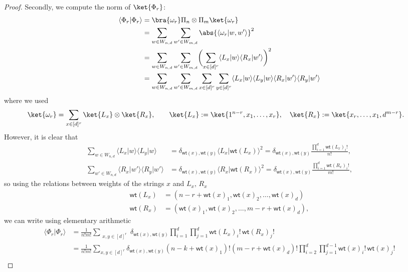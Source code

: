 \documentclass[aps,twocolumn,pra,superscriptaddress,nofootinbib]{revtex4-2}
\DeclarePairedDelimiter{\of}{\lparen}{\rparen}
\newcommand{\brakett}[2]{\langle #1 \vert #2 \rangle}
\begin{document}
\begin{proof}
    Secondly, we compute the norm of $\ket{\Phi_r}$:
    \begin{align}
        \brakett{\Phi_r}{\Phi_r} &= \bra{\omega_r} \Pi_{n} \otimes \Pi_{m} \ket{\omega_r} \\
        &= \sum_{w \in W_{n,d}} \sum_{w' \in W_{m,d}} \abs{\brakett{\omega_r}{w, w'}}^2 \\
        &= \sum_{w \in W_{n,d}} \sum_{w' \in W_{m,d}} \of[\bigg]{\sum_{x \in [d]^r} \brakett{L_x}{w} \brakett{R_x}{w'}}^2\\
        &= \sum_{w \in W_{n,d}} \sum_{w' \in W_{m,d}} \sum_{x \in [d]^r} \sum_{y \in [d]^r} \brakett{L_x}{w} \brakett{L_y}{w} \brakett{R_x}{w'} \brakett{R_y}{w'}
    \end{align}
    where we used
    \begin{align}
        \ket{\omega_r} &= \sum_{x \in [d]^r} \ket{L_x} \otimes \ket{R_x}, \qquad \ket{L_x} := \ket{1^{n-r},x_1,\dotsc,x_r}, \quad \ket{R_x} := \ket{x_r,\dotsc,x_1,d^{m-r}}.
    \end{align}
    However, it is clear that
    \begin{align}
        \sum_{w \in W_{n,d}} \brakett{L_x}{w} \brakett{L_y}{w} &= \delta_{\mathsf{wt}(x),\mathsf{wt}(y)} \brakett{L_x}{\mathsf{wt}(L_x)}^2 = \delta_{\mathsf{wt}(x),\mathsf{wt}(y)} \frac{\prod_{i=1}^d \mathsf{wt}(L_x)_i!}{n!}, \\
        \sum_{w' \in W_{n,d}} \brakett{R_x}{w'}\brakett{R_y}{w'} &= \delta_{\mathsf{wt}(x),\mathsf{wt}(y)} \brakett{R_x}{\mathsf{wt}(R_x)}^2 = \delta_{\mathsf{wt}(x),\mathsf{wt}(y)} \frac{\prod_{i=1}^d \mathsf{wt}(R_x)_i!}{m!},
    \end{align}
    so using the relations between weights of the strings $x$ and $L_x, \, R_x$
    \begin{align}
        \mathsf{wt}(L_x) &= (n-r + \mathsf{wt}(x)_1,\mathsf{wt}(x)_2,\dotsc,\mathsf{wt}(x)_d) \\
        \mathsf{wt}(R_x) &= (\mathsf{wt}(x)_1,\mathsf{wt}(x)_2,\dotsc,m-r+\mathsf{wt}(x)_d),
    \end{align}
    we can write using elementary arithmetic
    \begin{align}
        \brakett{\Phi_r}{\Phi_r} &= \frac{1}{n! m!} \sum_{\substack{x,y \in [d]^r}} \delta_{\mathsf{wt}(x),\mathsf{wt}(y)} \prod_{i=1}^d \prod_{j=1}^d \mathsf{wt}(L_x)_i! \, \mathsf{wt}(R_x)_j! \\
        &= \frac{1}{n! m!} \sum_{x,y \in [d]^r} \delta_{\mathsf{wt}(x),\mathsf{wt}(y)} (n-k+\mathsf{wt}(x)_1)! (m-r+\mathsf{wt}(x)_d)! \prod_{i=2}^d \prod_{j=1}^{d-1} \mathsf{wt}(x)_i! \,  \mathsf{wt}(x)_j! \\

\end{align}
\end{proof}
\end{document}
